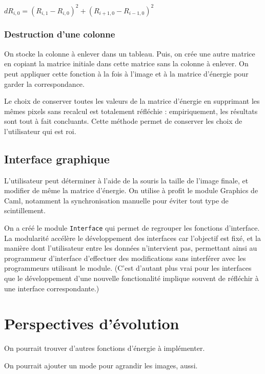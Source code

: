 \documentclass[a4paper]{article}
\begin{document}
$dR_{i,0} = (R_{i,1} - R_{i,0})^2 + (R_{i+1,0} - R_{i-1,0})^2$


\subsubsection{Destruction d'une colonne}

On stocke la colonne à enlever dans un tableau. Puis, on crée une autre matrice en copiant la matrice initiale dans cette matrice sans la colonne à enlever. On peut appliquer cette fonction à la fois à l'image et à la matrice d'énergie pour garder la correspondance.

Le choix de conserver toutes les valeurs de la matrice d'énergie en supprimant les mêmes pixels sans recalcul est totalement réfléchie : empiriquement, les résultats sont tout à fait concluants. Cette méthode permet de conserver les choix de l'utilisateur qui est roi.


\subsection{Interface graphique}

L'utilisateur peut déterminer à l'aide de la souris la taille de l'image finale, et modifier de même la matrice d'énergie. On utilise à profit le module Graphics de Caml, notamment la synchronisation manuelle pour éviter tout type de scintillement.

On a créé le module {\tt Interface} qui permet de regrouper les fonctions d'interface. La modularité
accélère le développement des interfaces car l'objectif est fixé, et la manière dont l'utilisateur entre les données n'intervient pas, permettant ainsi au programmeur d'interface d'effectuer des modifications sans interférer avec les programmeurs utilisant le module. (C'est d'autant plus vrai pour les interfaces que le développement d'une nouvelle fonctionalité implique souvent de réfléchir à une interface correspondante.)

\section{Perspectives d'évolution}

On pourrait trouver d'autres fonctions d'énergie à implémenter.

On pourrait ajouter un mode pour agrandir les images, aussi.
\end{document}
